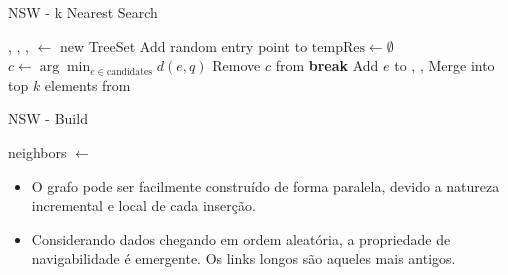 \documentclass[11pt]{beamer}
\begin{document}
\begin{frame}{NSW - k Nearest Search}

\begin{algorithm}[H]
\caption{NSW k Nearest Neighbors Search}\label{alg:NSW-KNNS}
\begin{algorithmic}[1]

\State {}, , ,  $\gets$ new TreeSet
    \State Add random entry point to 
    \State $\text{tempRes} \gets \emptyset$
        \State $c \gets \arg\min_{e \in \text{candidates}} d(e, q)$
        \State Remove $c$ from 
            \State \textbf{break}
        \EndIf
                \State Add $e$ to , , 
            \EndIf
        \EndFor
    \EndWhile
    \State Merge  into  
\EndFor
\State \Return top $k$ elements from 
\EndProcedure
\end{algorithmic}
\end{algorithm}


\end{frame}

\begin{frame}{NSW - Build}

\begin{algorithm}[H]
\caption{NSW Build}\label{alg:NSWBuild}
\begin{algorithmic}[1]
\State neighbors $\gets$ 
\State {}
\EndProcedure
\end{algorithmic}
\end{algorithm}

\begin{itemize}
    \item O grafo pode ser facilmente construído de forma paralela, devido a natureza incremental e local de cada inserção.
    \item Considerando dados chegando em ordem aleatória, a propriedade de navigabilidade é emergente. Os links longos são aqueles mais antigos.
\end{itemize}

\end{frame}
\end{document}
